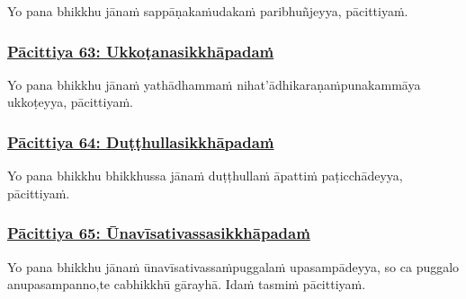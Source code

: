 Yo pana bhikkhu jānaṁ sappāṇakaṁ\makeatletter\hyperlink{endnote347-appendix}\makeatother \thinspace udakaṁ paribhuñjeyya, pācittiyaṁ.



\subsubsection*{\hyperref[exp63]{Pācittiya 63: Ukkoṭanasikkhāpadaṁ}}
\label{pac63}

Yo pana bhikkhu jānaṁ yathādhammaṁ nihat'ādhikaraṇaṁ\makeatletter\hyperlink{endnote348-appendix}\makeatother \thinspace punakammāya ukkoṭeyya, pācittiyaṁ.



\subsubsection*{\hyperref[exp64]{Pācittiya 64: Duṭṭhullasikkhāpadaṁ}}
\label{pac64}

Yo pana bhikkhu bhikkhussa jānaṁ duṭṭhullaṁ āpattiṁ paṭicchādeyya, pācittiyaṁ.



\subsubsection*{\hyperref[exp65]{Pācittiya 65: Ūnavīsativassasikkhāpadaṁ}}
\label{pac65}

Yo pana bhikkhu jānaṁ ūnavīsativassaṁ\makeatletter\hyperlink{endnote349-appendix}\makeatother \thinspace puggalaṁ upasampādeyya, so ca puggalo anupasampanno,\makeatletter\hyperlink{endnote350-appendix}\makeatother \thinspace te ca\makeatletter\hyperlink{endnote351-appendix}\makeatother \thinspace bhikkhū gārayhā. Idaṁ tasmiṁ pācittiyaṁ.



